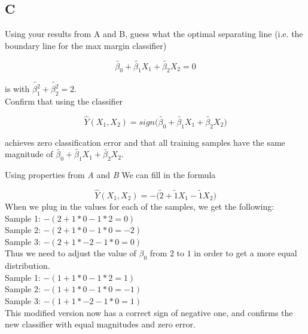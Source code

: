 \documentclass[12pt]{article}
\begin{document}
\subsection{C}
Using your results from A and B, guess what the optimal separating line (i.e. the boundary line for the max margin classifier)
\begin{center}
    \[
        \widetilde{\beta_0} + \widetilde{\beta_1}X_1 + \widetilde{\beta_2}X_2 = 0
    \]
\end{center}
is with $\widetilde{\beta_1^2} + \widetilde{\beta_2^2} = 2$.\\
Confirm that using the classifier
\begin{center}
    \[
        \hat{Y}(X_1, X_2) = sign \bigg(\widetilde{\beta_0} + \widetilde{\beta_1}X_1 + \widetilde{\beta_2}X_2 \bigg)
    \]
\end{center}
achieves zero classification error and that all training samples have the same magnitude of $\widetilde{\beta_0} + \widetilde{\beta_1}X_1 + \widetilde{\beta_2}X_2$.


Using properties from \emph{A} and \emph{B} We can fill in the formula
\begin{center}
    \[
        \hat{Y}(X_1, X_2) = - \bigg(\widetilde{2} + \widetilde{1}X_1 - \widetilde{1}X_2 \bigg)
    \]
    When we plug in the values for each of the samples, we get the following:\\
    Sample 1: $-(2+1*0-1*2 = 0)$\\
    Sample 2: $-(2+1*0-1*0 = -2)$\\
    Sample 3: $-(2+1*-2-1*0 = 0)$\\
    Thus we need to adjust the value of $\beta_0$ from $2$ to $1$ in order to get a more equal distribution.\\
    Sample 1: $-(1+1*0-1*2 = 1)$\\
    Sample 2: $-(1+1*0-1*0 = -1)$\\
    Sample 3: $-(1+1*-2-1*0 = 1)$\\
    This modified version now has a correct sign of negative one, and confirms the new classifier with equal magnitudes and zero error.
\end{center}



\pagebreak
\end{document}
